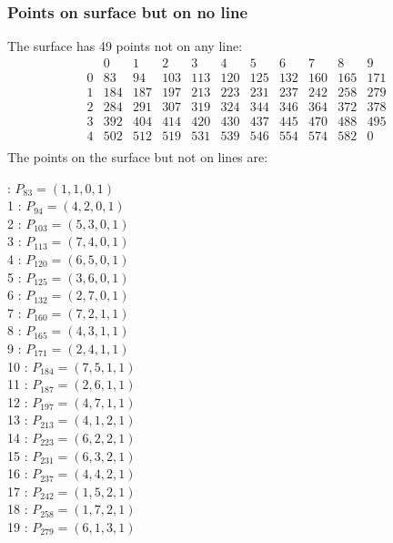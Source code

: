 \documentclass{article}
\begin{document}
{\subsubsection*{Points on surface but on no line}
The surface has 49 points not on any line:\\
$$
\begin{array}{r|*{10}{r}}
 & 0 & 1 & 2 & 3 & 4 & 5 & 6 & 7 & 8 & 9\\
\hline
0 & 83 & 94 & 103 & 113 & 120 & 125 & 132 & 160 & 165 & 171\\
1 & 184 & 187 & 197 & 213 & 223 & 231 & 237 & 242 & 258 & 279\\
2 & 284 & 291 & 307 & 319 & 324 & 344 & 346 & 364 & 372 & 378\\
3 & 392 & 404 & 414 & 420 & 430 & 437 & 445 & 470 & 488 & 495\\
4 & 502 & 512 & 519 & 531 & 539 & 546 & 554 & 574 & 582 & 0\\
\end{array}
$$
The points on the surface but not on lines are:\\
\begin{multicols}{2}
 : $P_{83}=( 1, 1, 0, 1 )$\\
1 : $P_{94}=( 4, 2, 0, 1 )$\\
2 : $P_{103}=( 5, 3, 0, 1 )$\\
3 : $P_{113}=( 7, 4, 0, 1 )$\\
4 : $P_{120}=( 6, 5, 0, 1 )$\\
5 : $P_{125}=( 3, 6, 0, 1 )$\\
6 : $P_{132}=( 2, 7, 0, 1 )$\\
7 : $P_{160}=( 7, 2, 1, 1 )$\\
8 : $P_{165}=( 4, 3, 1, 1 )$\\
9 : $P_{171}=( 2, 4, 1, 1 )$\\
10 : $P_{184}=( 7, 5, 1, 1 )$\\
11 : $P_{187}=( 2, 6, 1, 1 )$\\
12 : $P_{197}=( 4, 7, 1, 1 )$\\
13 : $P_{213}=( 4, 1, 2, 1 )$\\
14 : $P_{223}=( 6, 2, 2, 1 )$\\
15 : $P_{231}=( 6, 3, 2, 1 )$\\
16 : $P_{237}=( 4, 4, 2, 1 )$\\
17 : $P_{242}=( 1, 5, 2, 1 )$\\
18 : $P_{258}=( 1, 7, 2, 1 )$\\
19 : $P_{279}=( 6, 1, 3, 1 )$\\

\end{multicols}}
\end{document}

